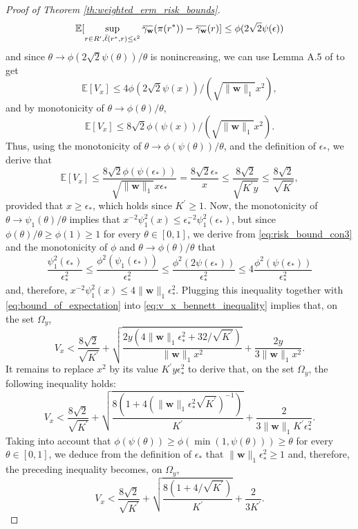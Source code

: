 \documentclass[letterpaper]{article} %
\newcommand{\E}{\mathbb{E}}
\newcommand{\overbar}[1]{\mkern 1.5mu\overline{\mkern-1.5mu#1\mkern-1.5mu}\mkern 1.5mu}
\newcommand*\cen[1]{\overbar{#1}}
\newcommand{\weight}{\mathbf{w}}
\newcommand{\relossf}{\bar{\ell}}
\newcommand{\cenprocess}[1]{\cen{\gamma_{#1}}}
\newcommand{\normo}[1]{\|#1\|_1}
\begin{document}
\begin{proof}[Proof of Theorem \ref{th:weighted_erm_risk_bounds}]
    \[\E[\sup_{r\in R^\prime,\relossf(r^*,r)\le \epsilon^2}\cenprocess{\weight}(\pi(r^*))-\cenprocess{\weight}(r)]\le \phi(2\sqrt{2}\psi(\epsilon))\]
    and since $\theta\to \phi(2\sqrt{2}\psi(\theta))/\theta$ is nonincreasing, we can use Lemma A.5 of \cite{Massart2006} to get
    \[\E[V_x]\le 4\phi(2\sqrt{2}\psi(x))/(\sqrt{\normo{\weight{}}}x^2),\]
    and by monotonicity of $\theta\to\phi(\theta)/\theta$,
    \[\E[V_x]\le 8\sqrt{2}\phi(\psi(x))/(\sqrt{\normo{\weight{}}}x^2).\]
    Thus, using the monotonicity of $\theta\to \phi(\psi(\theta))/\theta$, and the definition of $\epsilon_*$, we derive that
    \begin{equation}
        \label{eq:bound_of_expectation}
        \E[V_x]\le \frac{8\sqrt{2}\phi(\psi(\epsilon_*))}{\sqrt{\normo{\weight{}}}x\epsilon_*}=\frac{8\sqrt{2}\epsilon_*}{x}\le \frac{8\sqrt{2}}{\sqrt{K^\prime y}}\le \frac{8\sqrt{2}}{\sqrt{K^\prime}},
    \end{equation}
    provided that $x\ge \epsilon_*$, which holds since $K^\prime\ge 1$. Now, the monotonicity of $\theta\to\psi_1(\theta)/\theta$ implies that $x^{-2}\psi_1^2(x)\le \epsilon_*^{-2}\psi_1^2(\epsilon_*)$, but since $\phi(\theta)/\theta\ge \phi(1)\ge 1$ for every $\theta\in [0,1]$, we derive from \eqref{eq:risk_bound_con3} and the monotonicity of $\phi$ and $\theta\to\phi(\theta)/\theta$ that
    \[\frac{\psi_1^2(\epsilon_*)}{\epsilon_*^2}\le \frac{\phi^2(\psi_1(\epsilon_*))}{\epsilon_*^2}\le \frac{\phi^2(2\psi(\epsilon_*))}{\epsilon_*^2}\le 4\frac{\phi^2(\psi(\epsilon_*))}{\epsilon_*^2}\]
    and, therefore, $x^{-2}\psi_1^2(x)\le 4\normo{\weight{}}\epsilon_*^2$. Plugging this inequality together with \eqref{eq:bound_of_expectation} into \eqref{eq:v_x_bennett_inequality} implies that, on the set $\Omega_y$,
    \[V_x < \frac{8\sqrt{2}}{\sqrt{K^\prime}}+\sqrt{\frac{2y(4\normo{\weight{}}\epsilon_*^2+32/\sqrt{K^\prime})}{\normo{\weight{}}x^2}}+\frac{2y}{3\normo{\weight{}}x^2}.\]
    It remains to replace $x^2$ by its value $K^\prime y\epsilon_*^2$ to derive that, on the set $\Omega_y$, the following inequality holds:
    \[V_x < \frac{8\sqrt{2}}{\sqrt{K^\prime}}+\sqrt{\frac{8(1+4(\normo{\weight{}}\epsilon_*^2\sqrt{K^\prime})^{-1})}{K^\prime}}+\frac{2}{3\normo{\weight{}}K^\prime\epsilon_*^2}.\]
    Taking into account that $\phi(\psi(\theta))\ge \phi(\min(1,\psi(\theta)))\ge \theta$ for every $\theta\in [0,1]$, we deduce from the definition of $\epsilon_*$ that $\normo{\weight{}}\epsilon_*^2\ge 1$ and, therefore, the preceding inequality becomes, on $\Omega_y$,
    \[V_x < \frac{8\sqrt{2}}{\sqrt{K^\prime}}+\sqrt{\frac{8(1+4/\sqrt{K^\prime})}{K^\prime}}+\frac{2}{3K^\prime}.\]

\end{proof}
\end{document}
